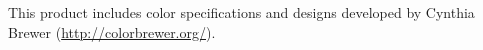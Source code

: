 This product includes color specifications and designs developed by
Cynthia Brewer (\url{http://colorbrewer.org/}).
